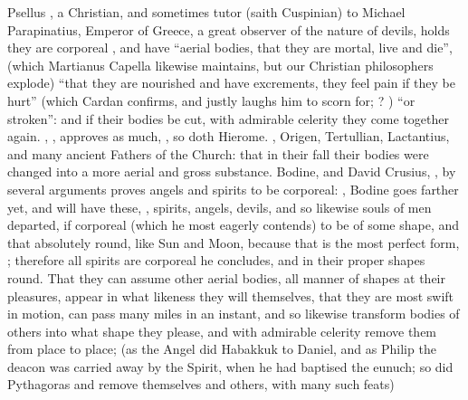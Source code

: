 Psellus , a Christian, and sometimes tutor (saith
Cuspinian) to Michael Parapinatius, Emperor of Greece, a great observer of the
nature of devils, holds they are corporeal , and have
\enquote{aerial bodies, that they are mortal, live and die}, (which Martianus Capella
likewise maintains, but our Christian philosophers explode) \enquote{that they
are nourished and have excrements, they feel pain if they
be hurt} (which Cardan confirms, and \Scaliger{} justly laughs him to scorn for;
? \etc{}) \enquote{or stroken}:
and if their bodies be cut, with admirable celerity they come together again.
\Austin{}, , approves as much,
, so doth
Hierome. , Origen,
Tertullian, Lactantius, and many ancient Fathers of the Church: that in their
fall their bodies were changed into a more aerial and gross substance. Bodine,
 and David Crusius,
, by several
arguments proves angels and spirits to be corporeal: , \etc{} Bodine goes farther
yet, and will have these, , spirits, angels, devils,
and so likewise souls of men departed, if corporeal (which he most eagerly
contends) to be of some shape, and that absolutely round, like Sun and Moon,
because that is the most perfect form, ; therefore all spirits are
corporeal he concludes, and in their proper shapes round. That they can assume
other aerial bodies, all manner of shapes at their pleasures, appear in what
likeness they will themselves, that they are most swift in motion, can pass
many miles in an instant, and so likewise transform bodies
of others into what shape they please, and with admirable celerity remove them
from place to place; (as the Angel did Habakkuk to Daniel, and as Philip the
deacon was carried away by the Spirit, when he had baptised the eunuch; so did
Pythagoras and \Apollonius{} remove themselves and others, with many such feats)
